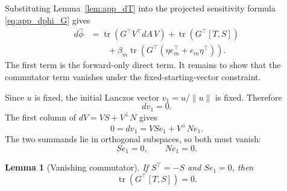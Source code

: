 \documentclass{article}
\newtheorem{lemma}[theorem]{Lemma}
\begin{document}
Substituting Lemma~\ref{lem:app_dT} into the projected sensitivity formula
\eqref{eq:app_dphi_G} gives
\begin{align}
    d\widehat{\phi}
    &=
    \operatorname{tr}(G^\top V^\top dA\,V)
    +
    \operatorname{tr}(G^\top[T,S]) \\
    &\qquad
    +
    \beta_m
    \operatorname{tr}\!\left(
        G^\top(\eta e_m^\top+e_m\eta^\top)
    \right).
    \label{eq:app_error_decomp}
\end{align}
The first term is the forward-only direct term. It remains to show that the commutator
term vanishes under the fixed-starting-vector constraint.

Since \(u\) is fixed, the initial Lanczos vector \(v_1=u/\|u\|\) is fixed. Therefore
\[
    dv_1=0.
\]
The first column of \(dV=VS+V^\perp N\) gives
\[
    0=dv_1=VSe_1+V^\perp Ne_1.
\]
The two summands lie in orthogonal subspaces, so both must vanish:
\begin{equation}
    Se_1=0,
    \qquad
    Ne_1=0.
    \label{eq:app_fixed_start}
\end{equation}

\begin{lemma}[Vanishing commutator]
\label{lem:app_commutator}
If \(S^\top=-S\) and \(Se_1=0\), then
\[
    \operatorname{tr}(G^\top[T,S])=0 .
\]
\end{lemma}
\end{document}
